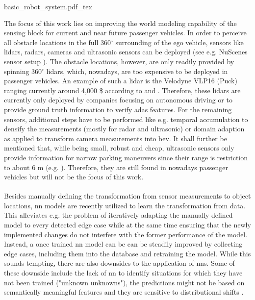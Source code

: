 \begin{center}
	{basic_robot_system.pdf_tex}
\end{center}
The focus of this work lies on improving the world modeling capability of the sensing block for current and near future passenger vehicles. In order to perceive all obstacle locations in the full 360$^{\circ}$ surrounding of the ego vehicle, sensors like lidars, radars, cameras and ultrasonic sensors can be deployed (see e.g. NuScenes sensor setup \cite{caesar2020nuscenes}). The obstacle locations, however, are only readily provided by spinning 360$^{\circ}$ lidars, which, nowadays, are too expensive to be deployed in passenger vehicles. An example of such a lidar is the Velodyne VLP16 (Puck) ranging currently around 4,000 \$ according to \cite{cnet2018} and \cite{velodyne2018}. Therefore, these lidars are currently only deployed by companies focusing on autonomous driving or to provide ground truth information to verify \gls{adas} features. For the remaining sensors, additional steps have to be performed like e.g. temporal accumulation to densify the measurements (mostly for radar and ultrasonic) or domain adaption as applied to transform camera measurements into \gls{bev}. It shall further be mentioned that, while being small, robust and cheap, ultrasonic sensors only provide information for narrow parking maneuvers since their range is restriction to about 6 m (e.g. \cite{boschultrasonic2022}). Therefore, they are still found in nowadays passenger vehicles but will not be the focus of this work.
\\\\
Besides manually defining the transformation from sensor measurements to object locations, \gls{nn} models are recently utilized to learn the transformation from data. This alleviates e.g. the problem of iteratively adapting the manually defined model to every detected edge case while at the same time ensuring that the newly implemented changes do not interfere with the former performance of the model. Instead, a once trained \gls{nn} model can be can be steadily improved by collecting edge cases, including them into the database and retraining the model. While this sounds tempting, there are also downsides to the application of \gls{nn}s. Some of these downside include the lack of \gls{nn} to identify situations for which they have not been trained ("unknown unknowns"), the predictions might not be based on semantically meaningful features and they are sensitive to distributional shifts \cite{safetyfirst2019}.
